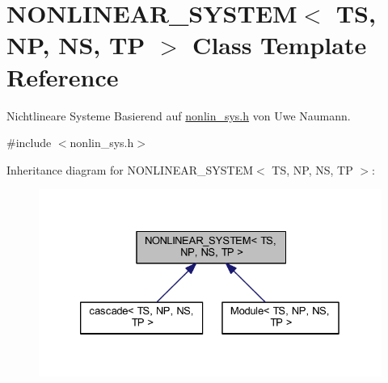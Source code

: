 \hypertarget{class_n_o_n_l_i_n_e_a_r___s_y_s_t_e_m}{}\section{N\+O\+N\+L\+I\+N\+E\+A\+R\+\_\+\+S\+Y\+S\+T\+EM$<$ TS, NP, NS, TP $>$ Class Template Reference}
\label{class_n_o_n_l_i_n_e_a_r___s_y_s_t_e_m}


Nichtlineare Systeme Basierend auf \mbox{\hyperlink{nonlin__sys_8h}{nonlin\+\_\+sys.\+h}} von Uwe Naumann.  




{\ttfamily \#include $<$nonlin\+\_\+sys.\+h$>$}



Inheritance diagram for N\+O\+N\+L\+I\+N\+E\+A\+R\+\_\+\+S\+Y\+S\+T\+EM$<$ TS, NP, NS, TP $>$\+:\nopagebreak
\begin{figure}[H]
\begin{center}
\leavevmode
\includegraphics[width=326pt]{class_n_o_n_l_i_n_e_a_r___s_y_s_t_e_m__inherit__graph}
\end{center}
\end{figure}
